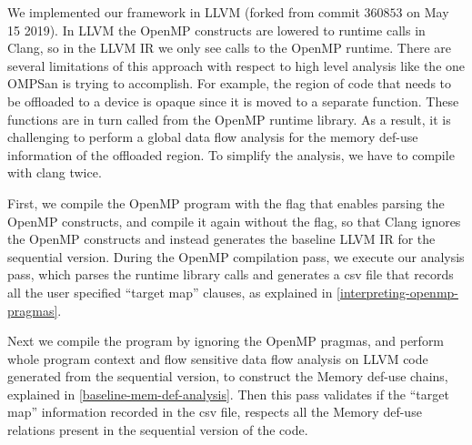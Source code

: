 \vspace{-10pt}
We implemented our framework in LLVM (forked from commit $360853$ on May 15 2019).
In LLVM the OpenMP constructs are lowered to runtime calls in Clang, so 
in the LLVM IR we only see calls to the OpenMP runtime. 
There are several limitations of this approach with respect 
to high level analysis like the one OMPSan is trying to accomplish.
For example, the region of code that needs to be offloaded to a device 
is opaque since it is moved to a separate function. 
These functions are in turn called from the OpenMP runtime library. 
As a result, it is challenging to perform a global data flow analysis 
for the memory def-use information of the offloaded region. 
To simplify the analysis, we have to compile with clang twice. 

First, we compile the OpenMP program with the flag that enables
parsing the OpenMP constructs, and compile it again without the flag, 
so that Clang ignores the OpenMP constructs and instead generates the 
baseline LLVM IR for the sequential version. 
During the OpenMP compilation pass, we execute 
our analysis pass, which parses the runtime library calls 
and generates a csv file that records all the user specified 
``target map'' clauses, as explained in \autoref{interpreting-openmp-pragmas}.

Next we compile the program by ignoring the OpenMP pragmas, 
and perform  whole program context and flow sensitive data flow analysis
on LLVM code generated from the sequential version, to construct
the Memory def-use chains, explained in 
\autoref{baseline-mem-def-analysis}.
Then this pass validates if the ``target map''
information recorded in the csv file, respects all the Memory 
def-use relations present in the sequential version of the code.
\vspace{-10pt}
